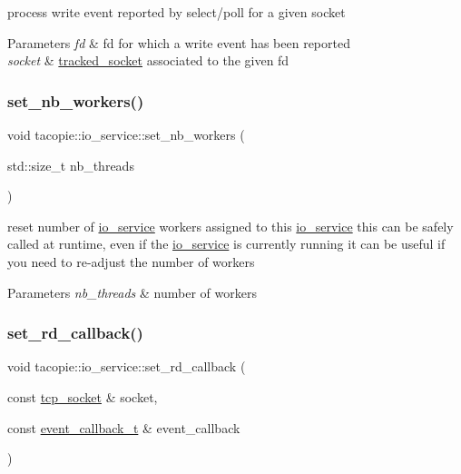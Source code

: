 process write event reported by select/poll for a given socket


\begin{DoxyParams}{Parameters}
{\em fd} & fd for which a write event has been reported \\
\hline
{\em socket} & \hyperlink{structtacopie_1_1io__service_1_1tracked__socket}{tracked\+\_\+socket} associated to the given fd \\
\hline
\end{DoxyParams}
\mbox{\label{classtacopie_1_1io__service_a7e2b0700c0a4591f86c344df8748b3a5}} 
\subsubsection{\texorpdfstring{set\+\_\+nb\+\_\+workers()}{set\_nb\_workers()}}
{\footnotesize\ttfamily void tacopie\+::io\+\_\+service\+::set\+\_\+nb\+\_\+workers (\begin{DoxyParamCaption}\item[{std\+::size\+\_\+t}]{nb\+\_\+threads }\end{DoxyParamCaption})}

reset number of \hyperlink{classtacopie_1_1io__service}{io\+\_\+service} workers assigned to this \hyperlink{classtacopie_1_1io__service}{io\+\_\+service} this can be safely called at runtime, even if the \hyperlink{classtacopie_1_1io__service}{io\+\_\+service} is currently running it can be useful if you need to re-\/adjust the number of workers


\begin{DoxyParams}{Parameters}
{\em nb\+\_\+threads} & number of workers \\
\hline
\end{DoxyParams}
\mbox{\label{classtacopie_1_1io__service_a8094c1fec76c6821cc0c008fe524c89a}} 
\subsubsection{\texorpdfstring{set\+\_\+rd\+\_\+callback()}{set\_rd\_callback()}}
{\footnotesize\ttfamily void tacopie\+::io\+\_\+service\+::set\+\_\+rd\+\_\+callback (\begin{DoxyParamCaption}\item[{const \hyperlink{classtacopie_1_1tcp__socket}{tcp\+\_\+socket} \&}]{socket,  }\item[{const \hyperlink{classtacopie_1_1io__service_abb66850c32d9c724f4418d77bd04bcfd}{event\+\_\+callback\+\_\+t} \&}]{event\+\_\+callback }\end{DoxyParamCaption})}

